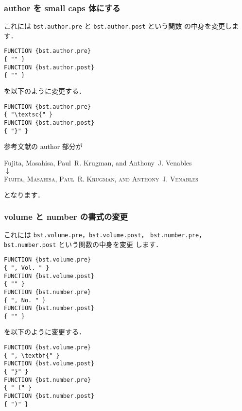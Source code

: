 \documentclass[a4j,10pt]{jarticle}
\begin{document}
\subsubsection{author を small caps 体にする}

これには \texttt{bst.author.pre} と \texttt{bst.author.post} という関数
の中身を変更します．

\begin{screen}
\begin{verbatim}
FUNCTION {bst.author.pre}
{ "" }
FUNCTION {bst.author.post}
{ "" }
\end{verbatim}
\end{screen}
を以下のように変更する．
\begin{screen}
\begin{verbatim}
FUNCTION {bst.author.pre}
{ "\textsc{" }
FUNCTION {bst.author.post}
{ "}" }
\end{verbatim}
\end{screen}

参考文献の author 部分が
\begin{center}
Fujita, Masahisa, Paul~R. Krugman, and Anthony~J. Venables \\
 $\downarrow$ \\
\textsc{Fujita, Masahisa, Paul~R. Krugman, and Anthony~J. Venables}
\end{center}
となります．

\subsubsection{volume と number の書式の変更}

これには \texttt{bst.volume.pre}，\texttt{bst.volume.post}，
\texttt{bst.number.pre}，\texttt{bst.number.post} という関数の中身を変更
します．

\begin{screen}
\begin{verbatim}
FUNCTION {bst.volume.pre}
{ ", Vol. " }
FUNCTION {bst.volume.post}
{ "" }
FUNCTION {bst.number.pre}
{ ", No. " }
FUNCTION {bst.number.post}
{ "" }
\end{verbatim}
\end{screen}
を以下のように変更する．
\begin{screen}
\begin{verbatim}
FUNCTION {bst.volume.pre}
{ ", \textbf{" }
FUNCTION {bst.volume.post}
{ "}" }
FUNCTION {bst.number.pre}
{ " (" }
FUNCTION {bst.number.post}
{ ")" }
\end{verbatim}
\end{screen}
\end{document}
